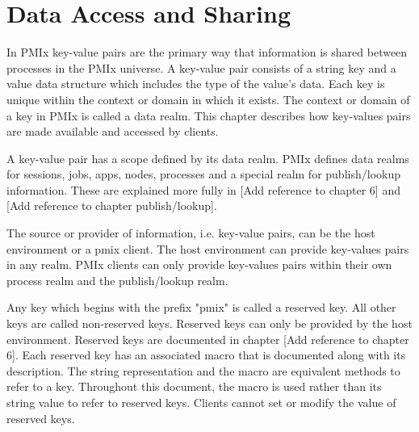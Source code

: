 \chapter{Data Access and Sharing}
\label{chap:api_sync_acc}

In \ac{PMIx} key-value pairs are the primary way that information is shared 
between processes in the \ac{PMIx} universe.  
A key-value pair consists of a string key and a value data structure
which includes the type of the value's data.  
Each key is unique within the context or domain in which it exists.
The context or domain of a key in PMIx is called a data realm.  
This chapter describes how key-values pairs are made available and accessed by clients.

A key-value pair has a scope defined by its data realm.  
PMIx defines data realms for sessions, jobs, apps, nodes, processes and a special 
realm for publish/lookup information.   
These are explained more fully in [Add reference to chapter 6] and [Add reference to chapter publish/lookup].

The source or provider of information, i.e. key-value pairs, can be the host environment or a pmix client.  
The host environment can provide key-values pairs in any realm.
PMIx clients can only provide key-values pairs within their own process realm and the publish/lookup realm.

Any key which begins with the prefix "pmix" is called a reserved key.
All other keys are called non-reserved keys.
Reserved keys can only be provided by the host environment.  
Reserved keys are documented in chapter [Add reference to chapter 6].   
Each reserved key has an associated macro that is documented along with its description.  
The string representation and the macro are equivalent methods to refer to a key.
Throughout this document, the macro is used rather than its string value to refer to reserved keys.
Clients cannot set or modify the value of reserved keys.

